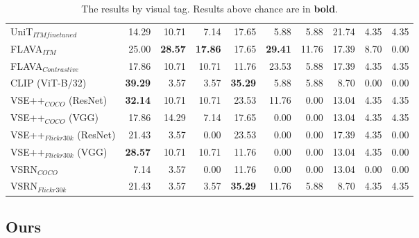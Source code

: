\begin{table*}
\begin{adjustbox}{max width=\textwidth}
\begin{tabular}{l|rrr|rrr|rrr}
 UniT$_{ITM finetuned}$       & 14.29          & 10.71          & 7.14           & 17.65          & 5.88           & 5.88           & 21.74          & 4.35           & 4.35           \\
 FLAVA$_{ITM}$                & 25.00          & \textbf{28.57} & \textbf{17.86} & 17.65          & \textbf{29.41} & 11.76 & 17.39          &  8.70 &  0.00 \\
 FLAVA$_{Contrastive}$        & 17.86          & 10.71          & 10.71          & 11.76          & 23.53          & 5.88           & 17.39          & 4.35           &  4.35 \\
 CLIP (ViT-B/32)              & \textbf{39.29} & 3.57           & 3.57           & \textbf{35.29} & 5.88           & 5.88           & 8.70           & 0.00           & 0.00           \\
 VSE++$_{COCO}$ (ResNet)      & \textbf{32.14} & 10.71          & 10.71          & 23.53          & 11.76          & 0.00           & 13.04          & 4.35           & 4.35           \\
 VSE++$_{COCO}$ (VGG)         & 17.86          & 14.29          & 7.14           & 17.65          & 0.00           & 0.00           & 13.04          & 4.35           & 4.35           \\
 VSE++$_{Flickr30k}$ (ResNet) & 21.43          & 3.57           & 0.00           & 23.53          & 0.00           & 0.00           & 17.39          & 4.35           & 0.00           \\
 VSE++$_{Flickr30k}$ (VGG)    & \textbf{28.57} & 10.71          & 10.71          & 11.76          & 0.00           & 0.00           & 13.04          & 4.35           & 0.00           \\
 VSRN$_{COCO}$                & 7.14           & 3.57           & 0.00           & 11.76          & 0.00           & 0.00           & 13.04          & 0.00           & 0.00           \\
 VSRN$_{Flickr30k}$           & 21.43          & 3.57           & 3.57           & \textbf{35.29} & 11.76          & 5.88           & 8.70           & 4.35           & 4.35           \\
    \bottomrule
  \end{tabular}
  \end{adjustbox}
  \caption{The results by visual tag. Results above chance are in \textbf{bold}.}
    \label{tab:results-by-visual-tag-baseline}
\end{table*}

\subsection{Ours}

